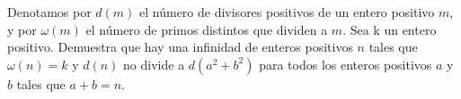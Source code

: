 Denotamos por $d(m)$ el número de divisores positivos de un entero positivo $m$, y por
$\omega(m)$ el número de primos distintos que dividen a $m$. Sea k un entero positivo. Demuestra que hay
una infinidad de enteros positivos $n$ tales que $\omega(n) = k$ y $d(n)$ no divide a $d(a^2 + b^2)$ para todos los enteros positivos $a$ y $b$ tales que $a + b = n$.